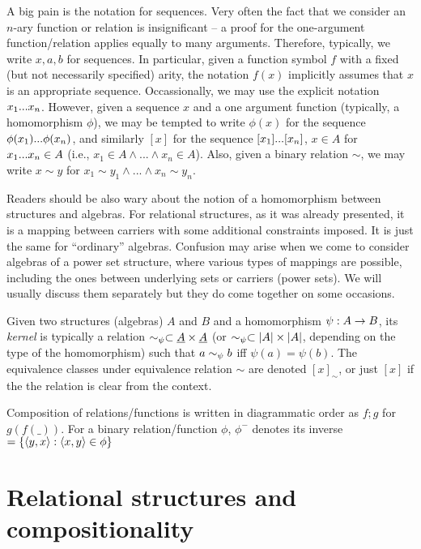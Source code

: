 \documentclass[10pt]{article}
\begin{document}
A big pain is the notation for sequences. Very often the fact that we consider
an $n$-ary function or relation is insignificant -- a proof for 
the one-argument function/relation applies equally to many arguments. 
Therefore, typically, we write
$x,a,b$ for sequences. In particular, given a function symbol $f$ with a fixed (but
not necessarily specified)
arity, the notation $f(x)$ implicitly assumes that $x$ is an appropriate sequence.
Occassionally, we may use the explicit notation $x_{1}...x_{n}$.
However,
given a sequence $x$ and a one argument function (typically, a homomorphism
 $\phi$), we may be tempted to write $\phi(x)$ for the sequence
$\phi(x_{1})...\phi(x_{n})$, and similarly $[x]$ for the sequence $[x_{1}]...[x_{n}]$, 
$x\in A$ for $x_{1}...x_{n}\in A$ (i.e., $x_1\in A\land...\land x_n\in A$).
Also, given a binary relation $\sim$, 
we may write $x\sim y$ for $x_1\sim y_1 \land...\land x_n\sim y_n$.

Readers should be also wary about the notion of a homomorphism between
structures and algebras. For relational structures, as it was already
presented, it is a mapping between carriers with some additional
constraints imposed. It is just the same for ``ordinary''
algebras. Confusion may arise when we come to consider algebras
of a power set structure, where various types of mappings are possible,
including the ones between underlying sets or carriers (power
sets). We will usually discuss them separately but they do come
together on some occasions. 

Given two structures (algebras) $A$ and $B$ and a homomorphism $\psi :
A \rightarrow B$, its {\em kernel\/} is typically a relation
$\sim_\psi \subset \underline {A}\times\underline {A}$ 
(or $\sim_\psi \subset |A|\times |A|$, depending on the type of the 
homomorphism) such that
$a\sim_\psi b$ iff $\psi(a)=\psi(b)$. The equivalence classes under
equivalence relation $\sim$ are denoted $[x]_\sim$, or just $[x]$ if 
the the relation is clear from the context.

Composition of relations/functions is written in diagrammatic order
as $f;g$ for $g(f(\_))$. For a binary relation/function $\phi$, $\phi^-$
 denotes its inverse $=\{\langle y,x\rangle:\langle x,y\rangle\in\phi\}$



\section{Relational structures and compositionality}
\label{se:comp}
\end{document}
